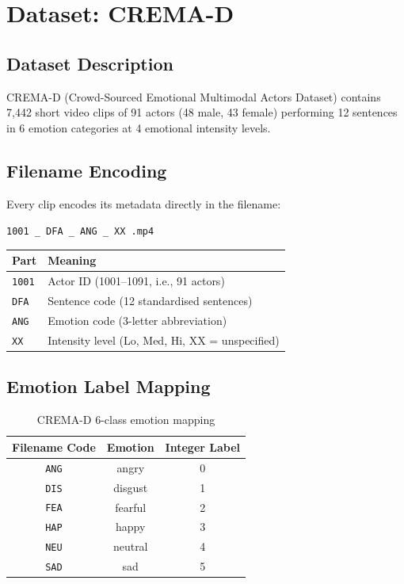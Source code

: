 \documentclass[12pt,a4paper]{article}
\theoremstyle{definition}
\theoremstyle{remark}
\begin{document}
\section{Dataset: CREMA-D}

\subsection{Dataset Description}

CREMA-D (Crowd-Sourced Emotional Multimodal Actors Dataset) contains 7,442
short video clips of 91 actors (48 male, 43 female) performing 12 sentences
in 6 emotion categories at 4 emotional intensity levels.

\subsection{Filename Encoding}

Every clip encodes its metadata directly in the filename:

\begin{center}
\texttt{1001 \_ DFA \_ ANG \_ XX .mp4}
\end{center}
\begin{center}
\begin{tabular}{ll}
\toprule
Part & Meaning \\
\midrule
\texttt{1001}  & Actor ID (1001–1091, i.e., 91 actors) \\
\texttt{DFA}   & Sentence code (12 standardised sentences) \\
\texttt{ANG}   & Emotion code (3-letter abbreviation) \\
\texttt{XX}    & Intensity level (Lo, Med, Hi, XX = unspecified) \\
\bottomrule
\end{tabular}
\end{center}

\subsection{Emotion Label Mapping}

\begin{table}[H]
\centering
\caption{CREMA-D 6-class emotion mapping}
\begin{tabular}{ccc}
\toprule
\textbf{Filename Code} & \textbf{Emotion} & \textbf{Integer Label} \\
\midrule
\texttt{ANG} & angry   & 0 \\
\texttt{DIS} & disgust & 1 \\
\texttt{FEA} & fearful & 2 \\
\texttt{HAP} & happy   & 3 \\
\texttt{NEU} & neutral & 4 \\
\texttt{SAD} & sad     & 5 \\
\bottomrule
\end{tabular}
\end{table}
\end{document}
